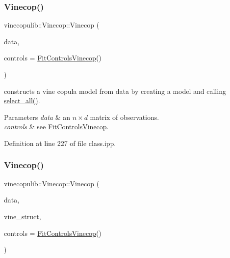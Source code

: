 \subsubsection{\texorpdfstring{Vinecop()}{Vinecop()}\hspace{0.1cm}{\footnotesize\ttfamily [8/13]}}
{\footnotesize\ttfamily vinecopulib\+::\+Vinecop\+::\+Vinecop (\begin{DoxyParamCaption}\item[{const Eigen\+::\+Matrix\+Xd \&}]{data,  }\item[{const \hyperlink{classvinecopulib_1_1_fit_controls_vinecop}{Fit\+Controls\+Vinecop} \&}]{controls = {\ttfamily \hyperlink{classvinecopulib_1_1_fit_controls_vinecop}{Fit\+Controls\+Vinecop}()} }\end{DoxyParamCaption})\hspace{0.3cm}{\ttfamily [inline]}}



constructs a vine copula model from data by creating a model and calling \hyperlink{classvinecopulib_1_1_vinecop_a0d2fae568f3d893c1c144a8034fbaf90}{select\+\_\+all()}. 


\begin{DoxyParams}{Parameters}
{\em data} & an $ n \times d $ matrix of observations. \\
\hline
{\em controls} & see \hyperlink{classvinecopulib_1_1_fit_controls_vinecop}{Fit\+Controls\+Vinecop}. \\
\hline
\end{DoxyParams}


Definition at line 227 of file class.\+ipp.

\mbox{\label{classvinecopulib_1_1_vinecop_ac8e2119b7cd9d2f67a8a62e7b4fbd61f}} 
\subsubsection{\texorpdfstring{Vinecop()}{Vinecop()}\hspace{0.1cm}{\footnotesize\ttfamily [9/13]}}
{\footnotesize\ttfamily vinecopulib\+::\+Vinecop\+::\+Vinecop (\begin{DoxyParamCaption}\item[{const Eigen\+::\+Matrix\+Xd \&}]{data,  }\item[{const \hyperlink{classvinecopulib_1_1_r_vine_structure}{R\+Vine\+Structure} \&}]{vine\+\_\+struct,  }\item[{\hyperlink{classvinecopulib_1_1_fit_controls_vinecop}{Fit\+Controls\+Vinecop}}]{controls = {\ttfamily \hyperlink{classvinecopulib_1_1_fit_controls_vinecop}{Fit\+Controls\+Vinecop}()} }\end{DoxyParamCaption})\hspace{0.3cm}{\ttfamily [inline]}}



